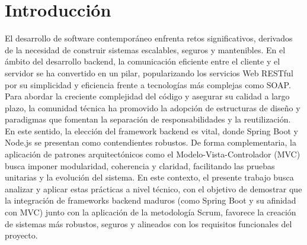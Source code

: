 \section{Introducción}
El desarrollo de software contemporáneo enfrenta retos significativos, derivados de la necesidad de construir sistemas escalables, seguros y mantenibles. En el ámbito del desarrollo backend, la comunicación eficiente entre el cliente y el servidor se ha convertido en un pilar, popularizando los servicios Web RESTful por su simplicidad y eficiencia frente a tecnologías más complejas como SOAP.
Para abordar la creciente complejidad del código y asegurar su calidad a largo plazo, la comunidad técnica ha promovido la adopción de estructuras de diseño y paradigmas que fomentan la separación de responsabilidades y la reutilización. En este sentido, la elección del framework backend es vital, donde Spring Boot y Node.js se presentan como contendientes robustos. De forma complementaria, la aplicación de patrones arquitectónicos como el Modelo-Vista-Controlador (MVC) busca imponer modularidad, coherencia y claridad, facilitando las pruebas unitarias y la evolución del sistema.
En este contexto, el presente trabajo busca analizar y aplicar estas prácticas a nivel técnico, con el objetivo de demostrar que la integración de frameworks backend maduros (como Spring Boot y su afinidad con MVC) junto con la aplicación de la metodología Scrum, favorece la creación de sistemas más robustos, seguros y alineados con los requisitos funcionales del proyecto.